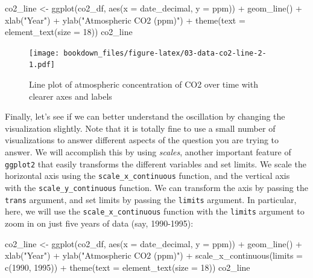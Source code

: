 \documentclass[
]{krantz}
\makeatletter
\newenvironment{Shaded}{\begin{snugshade}}{\end{snugshade}}
\newcommand{\AttributeTok}[1]{\textcolor[rgb]{0.61,0.61,0.61}{#1}}
\newcommand{\DecValTok}[1]{\textcolor[rgb]{0.06,0.06,0.06}{#1}}
\newcommand{\FunctionTok}[1]{\textcolor[rgb]{0,0,0}{#1}}
\newcommand{\NormalTok}[1]{#1}
\newcommand{\OtherTok}[1]{\textcolor[rgb]{0.37,0.37,0.37}{#1}}
\newcommand{\SpecialCharTok}[1]{\textcolor[rgb]{0,0,0}{#1}}
\newcommand{\StringTok}[1]{\textcolor[rgb]{0.5,0.5,0.5}{#1}}
\newenvironment{kframe}{%
\medskip{}
\setlength{\fboxsep}{.8em}
 \def\at@end@of@kframe{}%
 \ifinner\ifhmode%
  \def\at@end@of@kframe{\end{minipage}}%
  \begin{minipage}{\columnwidth}%
 \fi\fi%
 \def\FrameCommand##1{\hskip\@totalleftmargin \hskip-\fboxsep
 \colorbox{shadecolor}{##1}\hskip-\fboxsep
     \hskip-\linewidth \hskip-\@totalleftmargin \hskip\columnwidth}%
 \MakeFramed {\advance\hsize-\width
   \@totalleftmargin\z@ \linewidth\hsize
   \@setminipage}}%
 {\par\unskip\endMakeFramed%
 \at@end@of@kframe}
\renewenvironment{Shaded}{\begin{kframe}}{\end{kframe}}
\makeatother
\begin{document}
\begin{Shaded}
\begin{Highlighting}[]
\NormalTok{co2\_line }\OtherTok{\textless{}{-}} \FunctionTok{ggplot}\NormalTok{(co2\_df, }\FunctionTok{aes}\NormalTok{(}\AttributeTok{x =}\NormalTok{ date\_decimal, }\AttributeTok{y =}\NormalTok{ ppm)) }\SpecialCharTok{+}
  \FunctionTok{geom\_line}\NormalTok{() }\SpecialCharTok{+}
  \FunctionTok{xlab}\NormalTok{(}\StringTok{"Year"}\NormalTok{) }\SpecialCharTok{+}
  \FunctionTok{ylab}\NormalTok{(}\StringTok{"Atmospheric CO2 (ppm)"}\NormalTok{) }\SpecialCharTok{+}
  \FunctionTok{theme}\NormalTok{(}\AttributeTok{text =} \FunctionTok{element\_text}\NormalTok{(}\AttributeTok{size =} \DecValTok{18}\NormalTok{))}
\NormalTok{co2\_line}
\end{Highlighting}
\end{Shaded}

\begin{figure}
\centering
\texttt{[image: bookdown\_files/figure-latex/03-data-co2-line-2-1.pdf]}
\caption{\label{fig:03-data-co2-line-2}Line plot of atmospheric concentration of CO2 over time with clearer axes and labels}
\end{figure}

Finally, let's see if we can better understand the oscillation by changing the visualization slightly. Note that it is totally fine to use a small number of visualizations to answer different aspects of the question you are trying to answer. We will accomplish
this by using \emph{scales}, another important feature of \texttt{ggplot2} that easily transforms the different variables and set limits.
We scale the horizontal axis using the \texttt{scale\_x\_continuous} function, and the vertical axis with the \texttt{scale\_y\_continuous} function.
We can transform the axis by passing the \texttt{trans} argument, and set limits by passing the \texttt{limits} argument. In particular, here, we
will use the \texttt{scale\_x\_continuous} function with the \texttt{limits} argument to zoom in on just five years of data (say, 1990-1995):

\begin{Shaded}
\begin{Highlighting}[]
\NormalTok{co2\_line }\OtherTok{\textless{}{-}} \FunctionTok{ggplot}\NormalTok{(co2\_df, }\FunctionTok{aes}\NormalTok{(}\AttributeTok{x =}\NormalTok{ date\_decimal, }\AttributeTok{y =}\NormalTok{ ppm)) }\SpecialCharTok{+}
  \FunctionTok{geom\_line}\NormalTok{() }\SpecialCharTok{+}
  \FunctionTok{xlab}\NormalTok{(}\StringTok{"Year"}\NormalTok{) }\SpecialCharTok{+}
  \FunctionTok{ylab}\NormalTok{(}\StringTok{"Atmospheric CO2 (ppm)"}\NormalTok{) }\SpecialCharTok{+}
  \FunctionTok{scale\_x\_continuous}\NormalTok{(}\AttributeTok{limits =} \FunctionTok{c}\NormalTok{(}\DecValTok{1990}\NormalTok{, }\DecValTok{1995}\NormalTok{)) }\SpecialCharTok{+}
  \FunctionTok{theme}\NormalTok{(}\AttributeTok{text =} \FunctionTok{element\_text}\NormalTok{(}\AttributeTok{size =} \DecValTok{18}\NormalTok{))}
\NormalTok{co2\_line}
\end{Highlighting}
\end{Shaded}
\end{document}
